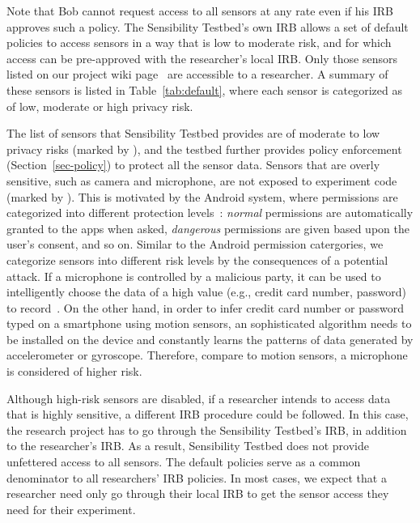 Note that Bob cannot request access to all sensors at any rate
even if his IRB approves such a policy. The Sensibility Testbed's
own IRB allows a set of default policies to access sensors in a
way that is low to moderate risk, and for which access can be pre-approved with the
researcher's local IRB. Only those sensors listed on our project 
wiki page~\cite{sensor-api} are accessible to a researcher. 
A summary of these sensors is listed in Table~\ref{tab:default}, 
where each sensor is categorized as of low, moderate or high 
privacy risk.

The list of sensors that Sensibility Testbed provides are of moderate 
to low privacy risks (marked by \tickmark), and the testbed further provides policy enforcement
(Section~\ref{sec-policy}) to protect all the sensor data. Sensors 
that are overly sensitive, such as camera and microphone, are not 
exposed to experiment code (marked by \xmark). This is motivated by the Android system, 
where permissions are categorized into different protection levels~\cite{level}:
\textit{normal} permissions are automatically granted to the apps when 
asked, \textit{dangerous} permissions are given based upon the 
user's consent, and so on. Similar to the Android permission catergories, 
we categorize sensors into different risk levels by the consequences
of a potential attack. If a microphone is controlled by 
a malicious party, it can be used to intelligently choose the data of a 
high value (e.g., credit card number, password) to record~\cite{zhang2015leave}. On the other 
hand, in order to infer credit card number or password typed on a 
smartphone using motion sensors, an sophisticated algorithm needs to 
be installed on the device and constantly learns 
the patterns of data generated by accelerometer or gyroscope. Therefore, 
compare to motion sensors, a microphone is considered of higher risk.

Although high-risk sensors are disabled, if a researcher intends to access  
data that is highly sensitive, a different IRB procedure could be followed. 
In this case, the research project has to go through the Sensibility 
Testbed's IRB, in addition to the researcher's IRB. 
%
%
As a result, Sensibility Testbed does not
provide unfettered access to all sensors. 
The default policies serve as a common denominator to all 
researchers' IRB policies. In most cases, we expect
that a researcher need only go through their local IRB to get
the sensor access they need for their experiment. 

